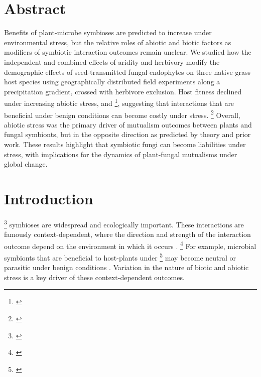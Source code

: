 \documentclass[12pt]{article}\usepackage[]{graphicx}\usepackage[dvipsnames]{xcolor}
\newcommand{\tom}[2]{{\color{red}{#1}}\footnote{\textit{\color{red}{#2}}}}
\begin{document}
\section*{Abstract}
Benefits of plant-microbe symbioses are predicted to increase under environmental stress, but the relative roles of abiotic and biotic factors as modifiers of symbiotic interaction outcomes remain unclear.
We studied how the independent and combined effects of aridity and herbivory modify the demographic effects of seed-transmitted fungal endophytes on three native grass host species using geographically distributed field experiments along a precipitation gradient, crossed with herbivore exclusion. 
Host fitness declined under increasing abiotic stress, and \tom{endophyte-symbiotic grasses often fared worse than non-symbiotic ones}{I know space is tight but can we make this a more specific or quantitative summary of the results?}, suggesting that interactions that are beneficial under benign conditions can become costly under stress. 
\tom{Herbivory had no detectable effect on host demography or endophyte-mediated outcomes.}{I think this is not true in the new results...?}
Overall, abiotic stress was the primary driver of  mutualism outcomes between plants and fungal symbionts, but in the opposite direction as predicted by theory and prior work. 
These results highlight that symbiotic fungi can become liabilities under stress, with implications for the dynamics of plant-fungal mutualisms under global change.

\newpage
\section*{Introduction}
\tom{Plant-microbe}{For Eco Letters I would keep this more generally, so start with symbiosis generally and not plant-microbe specifically. Aphid symbioses often involve protection from heat stress and defense against enemies, so it's an animal parallel to what we see in plants. For a broad journal, you will want to emphasize the breadth of these ideas.} symbioses are widespread and ecologically important. 
These interactions are famously context-dependent, where the direction and strength of the interaction outcome depend on the environment in which it occurs \citep{hoeksema2015context, bronstein1994conditional}.
\tom{}{To keep this very general, you may want to bring in the SGH here, and emphasize the point that stressful conditions are expected to strengthen positive interactions (the opposite of what you found).}
For example, microbial symbionts that are beneficial to host-plants under \tom{stressful conditions}{Since you are citing a specific example here, I would be more specific about what the stressful conditions were.}  may become neutral or parasitic under benign conditions \citep{giauque2019endophyte}. 
Variation in the nature of biotic and abiotic stress is a key driver of these context-dependent outcomes.
\end{document}
